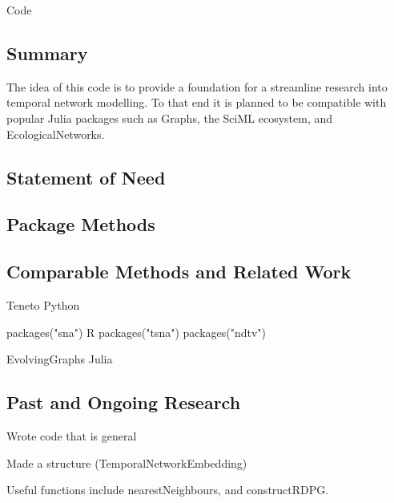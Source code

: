 \documentclass[12pt]{amsart}
\begin{document}
\begin{section}{Code}
    \subsection{Summary}
    The idea of this code is to provide a foundation for a streamline research into temporal network modelling. To that end it is planned to be compatible with popular Julia packages such as Graphs, the SciML ecosystem, and EcologicalNetworks.
    \subsection{Statement of Need}
    

    \subsection{Package Methods}
 
    \subsection{Comparable Methods and Related Work}
    Teneto Python

    packages("sna")  R
    packages("tsna")
    packages("ndtv")

    EvolvingGraphs Julia

    \subsection{Past and Ongoing Research}
    Wrote code that is general
    
    Made a structure (TemporalNetworkEmbedding)

    Useful functions include nearestNeighbours, and constructRDPG.
\end{section}


\printbibliography
\end{document}
